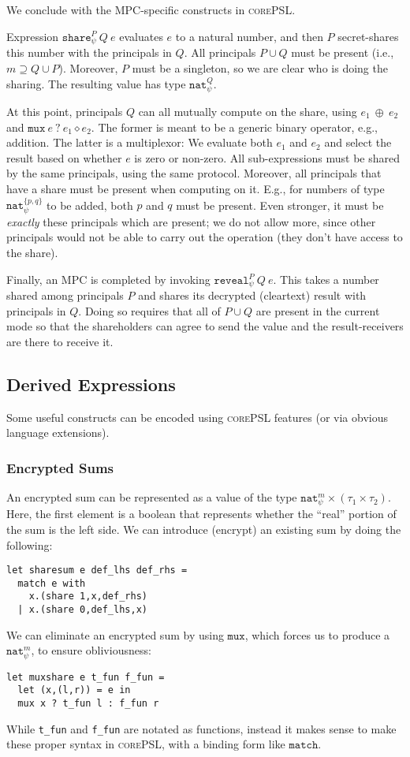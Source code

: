 \documentclass[10pt]{article}
\newcommand{\kw}[1]{\ensuremath{\mathtt{#1}}}
\newcommand{\tnat}{\ensuremath{\mathtt{nat}}}
\newcommand{\tpair}[2]{\ensuremath{{#1} \times {#2}}}
\newcommand{\ebinop}[2]{\ensuremath{{#1}~\oplus~{#2}}}
\newcommand{\ereveal}[4]{\ensuremath{\kw{reveal}^{#1}_{#4}~{#2}~{#3}}}
\newcommand{\emux}[3]{\ensuremath{\kw{mux}~{#1}~\kw{?}~{#2} \diamond {#3}}}
\newcommand{\eshare}[4]{\ensuremath{\kw{share}^{#2}_{#1}~{#3}~{#4}}}
\newcommand{\lang}{\textsc{corePSL}\xspace}
\begin{document}
We conclude with the MPC-specific constructs in \lang.

Expression $\eshare{\psi}{P}{Q}{e}$ evaluates $e$ to a natural number,
and then $P$ secret-shares this number with the principals in $Q$. All
principals $P \cup Q$ must be present (i.e.,
$m \supseteq Q \cup P$). Moreover, $P$ must be a singleton, so we
are clear who is doing the sharing. The resulting value has type
$\tnat^Q_\psi$.

At this point, principals $Q$ can all mutually compute on the share,
using $\ebinop{e_1}{e_2}$ and $\emux{e}{e_1}{e_2}$. The former is
meant to be a generic binary operator, e.g., addition. The latter is a
multiplexor: We evaluate both $e_1$ and $e_2$ and select the result
based on whether $e$ is zero or non-zero. All sub-expressions must be
shared by the same principals, using the same protocol. Moreover, all
principals that have a share must be present when computing on
it. E.g., for numbers of type $\tnat^{\{p,q\}}_\psi$ to be added, both
$p$ and $q$ must be present. Even stronger, it must be \emph{exactly}
these principals which are present; we do not allow more, since other
principals would not be able to carry out the operation (they don't
have access to the share).

Finally, an MPC is completed by invoking
$\ereveal{P}{Q}{e}{\psi}$. This takes a number shared among principals
$P$ and shares its decrypted (cleartext) result with principals in
$Q$. Doing so requires that all of $P \cup Q$ are present in the
current mode so that the shareholders can agree to send the value and
the result-receivers are there to receive it.

\subsection{Derived Expressions}
\label{sec:derived}

Some useful constructs can be encoded using \lang features (or via
obvious language extensions). 

\subsubsection{Encrypted Sums}

An encrypted sum can be represented as a value of the type
$\tpair{\tnat^m_\psi}{(\tpair{\tau_1}{\tau_2})}$. Here, the first
element is a boolean that represents whether the ``real'' portion of
the sum is the left side. We can introduce (encrypt) an existing sum
by doing the following:
\begin{verbatim}
let sharesum e def_lhs def_rhs =
  match e with
    x.(share 1,x,def_rhs)
  | x.(share 0,def_lhs,x)
\end{verbatim}
We can eliminate an encrypted sum by using $\kw{mux}$, which forces us
to produce a $\tnat^m_\psi$, to ensure obliviousness:
\begin{verbatim}
let muxshare e t_fun f_fun =
  let (x,(l,r)) = e in
  mux x ? t_fun l : f_fun r
\end{verbatim}
While \verb+t_fun+ and \verb+f_fun+ are notated as functions, instead
it makes sense to make these proper syntax in \lang, with a
binding form like $\kw{match}$.
\end{document}
